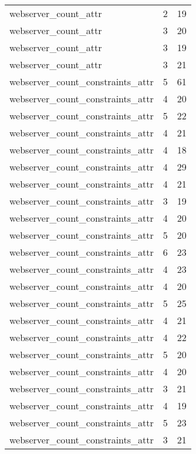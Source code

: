 \begin{table}
\begin{tabular}{lrr}
            webserver\_count\_attr &         2 &        19 \\
            webserver\_count\_attr &         3 &        20 \\
            webserver\_count\_attr &         3 &        19 \\
            webserver\_count\_attr &         3 &        21 \\
webserver\_count\_constraints\_attr &         5 &        61 \\
webserver\_count\_constraints\_attr &         4 &        20 \\
webserver\_count\_constraints\_attr &         5 &        22 \\
webserver\_count\_constraints\_attr &         4 &        21 \\
webserver\_count\_constraints\_attr &         4 &        18 \\
webserver\_count\_constraints\_attr &         4 &        29 \\
webserver\_count\_constraints\_attr &         4 &        21 \\
webserver\_count\_constraints\_attr &         3 &        19 \\
webserver\_count\_constraints\_attr &         4 &        20 \\
webserver\_count\_constraints\_attr &         5 &        20 \\
webserver\_count\_constraints\_attr &         6 &        23 \\
webserver\_count\_constraints\_attr &         4 &        23 \\
webserver\_count\_constraints\_attr &         4 &        20 \\
webserver\_count\_constraints\_attr &         5 &        25 \\
webserver\_count\_constraints\_attr &         4 &        21 \\
webserver\_count\_constraints\_attr &         4 &        22 \\
webserver\_count\_constraints\_attr &         5 &        20 \\
webserver\_count\_constraints\_attr &         4 &        20 \\
webserver\_count\_constraints\_attr &         3 &        21 \\
webserver\_count\_constraints\_attr &         4 &        19 \\
webserver\_count\_constraints\_attr &         5 &        23 \\
webserver\_count\_constraints\_attr &         3 &        21 \\

\end{tabular}
\end{table}
